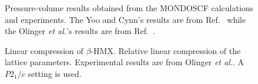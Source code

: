 \commentoutA{\documentclass[prl,aps,twocolumn,twocolumngrid,superbib]{revtex4}}
\begin{document}
\begin{figure}
\caption{
Pressure-volume results obtained from the MONDOSCF calculations and
experiments.  The Yoo and Cynn's results are from
Ref.~\cite{Yoo_1999v111} while the Olinger {\it et al.}'s
results are from Ref.~\cite{BOlinger78}.
}
\label{fig:pressure}
\end{figure}

\begin{figure}
\caption{
Linear compression of $\beta$-HMX. Relative linear compression of the
lattice parameters. Experimental results are from Olinger {\it et
al.}\cite{BOlinger78}. A $P2_1/c$ setting is used.
}
\label{fig:lin}
\end{figure}
\end{document}
